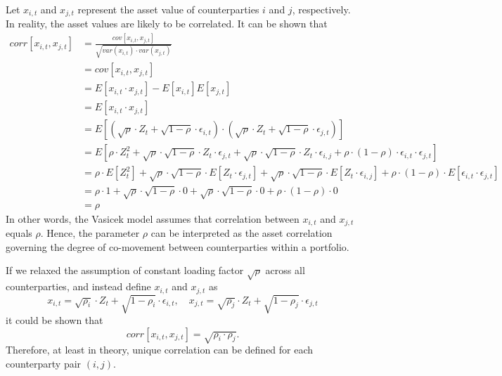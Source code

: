 \documentclass[11pt,a4paper]{article}
\begin{document}
Let $x_{i, t}$ and $x_{j, t}$ represent the asset value of counterparties $i$ and $j$, respectively. In reality, the asset values are likely to be correlated. It can be shown that
\begin{align}
corr[x_{i, t}, x_{j, t}] &= \frac{cov[x_{i, t}, x_{j, t}]}{\sqrt{var(x_{i,t}) \cdot var(x_{j, t})}} \nonumber \\
&= cov[x_{i, t}, x_{j, t}] \nonumber \\
&= E[x_{i, t} \cdot x_{j, t}] - E[x_{i, t}] E[x_{j, t}] \nonumber \\
&= E[x_{i, t} \cdot x_{j, t}] \nonumber \\
&= E[(\sqrt{\rho} \cdot Z_t + \sqrt{1 - \rho} \cdot \epsilon_{i, t}) \cdot (\sqrt{\rho} \cdot Z_t + \sqrt{1 - \rho} \cdot \epsilon_{j, t})] \nonumber \\
&= E[\rho \cdot Z_t^2 + \sqrt{\rho} \cdot \sqrt{1 - \rho} \cdot Z_t \cdot \epsilon_{j, t} + \sqrt{\rho} \cdot \sqrt{1 - \rho} \cdot Z_t \cdot \epsilon_{i, j} + \rho \cdot (1 - \rho) \cdot \epsilon_{i, t} \cdot \epsilon_{j, t}] \nonumber \\
&= \rho \cdot E[Z_t^2] + \sqrt{\rho} \cdot \sqrt{1 - \rho} \cdot E[Z_t \cdot \epsilon_{j, t}] + \sqrt{\rho} \cdot \sqrt{1 - \rho} \cdot E[Z_t \cdot \epsilon_{i, j}] + \rho \cdot (1 - \rho) \cdot E[\epsilon_{i, t} \cdot \epsilon_{j, t}] \nonumber \\
&= \rho \cdot 1 + \sqrt{\rho} \cdot \sqrt{1 - \rho} \cdot 0 + \sqrt{\rho} \cdot \sqrt{1 - \rho} \cdot 0 + \rho \cdot (1 - \rho) \cdot 0 \nonumber \\
&= \rho
\end{align}
In other words, the Vasicek model assumes that correlation between $x_{i, t}$ and $x_{j, t}$ equals $\rho$. Hence, the parameter $\rho$ can be interpreted as the asset correlation governing the degree of co-movement between counterparties within a portfolio.

If we relaxed the assumption of constant loading factor $\sqrt{\rho}$ across all counterparties, and instead define $x_{i, t}$ and $x_{j, t}$ as
\begin{equation}
x_{i, t} = \sqrt{\rho_i} \cdot Z_t + \sqrt{1 - \rho_i} \cdot \epsilon_{i, t}, \quad x_{j, t} = \sqrt{\rho_j} \cdot Z_t + \sqrt{1 - \rho_j} \cdot \epsilon_{j, t}
\end{equation}
it could be shown that
\begin{equation}
corr[x_{i, t}, x_{j, t}] = \sqrt{\rho_i \cdot \rho_j}.
\end{equation}
Therefore, at least in theory, unique correlation can be defined for each counterparty pair $(i, j)$.
\end{document}
